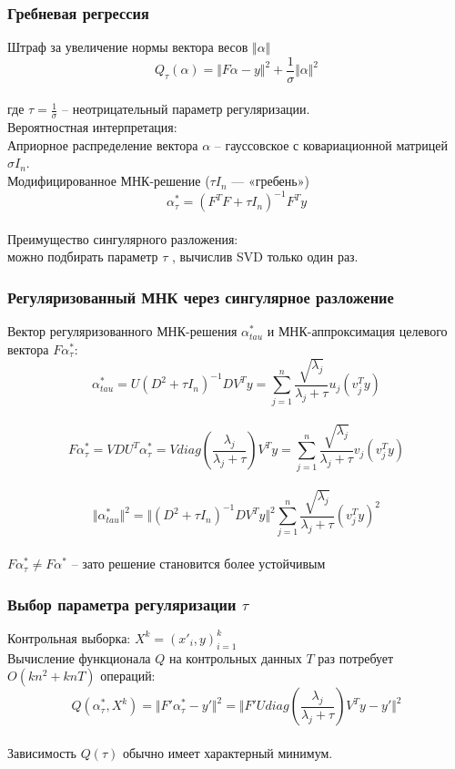 \documentclass[12pt]{beamer}
\begin{document}
\begin{frame}\frametitle{Гребневая регрессия}
Штраф за увеличение нормы вектора весов $\Vert \alpha \Vert$\\
$$Q_{\tau} (\alpha) = \Vert F \alpha - y \Vert^2 + \frac{1}{\sigma} \Vert \alpha \Vert^2$$\\
где $\tau = \frac{1}{\sigma}$ -- неотрицательный параметр регуляризации.\\
Вероятностная интерпретация: \\
Априорное распределение вектора $\alpha$ -- гауссовское с ковариационной матрицей $\sigma I_n$.\\
Модифицированное МНК-решение ($\tau I_n$ — «гребень»)\\
$$\alpha^*_{\tau} = (F^TF + \tau I_n)^{-1}F^Ty$$\\
Преимущество сингулярного разложения:\\
можно подбирать параметр $\tau$ , вычислив SVD только один раз.
\end{frame}

\begin{frame}\frametitle{Регуляризованный МНК через сингулярное разложение}
Вектор регуляризованного МНК-решения $\alpha_{tau}^*$ и МНК-аппроксимация целевого вектора $F\alpha_{\tau}^*$:\\
$$\alpha_{tau}^*= U(D^2 + \tau I_n)^{-1}DV^Ty = \sum\limits_{j=1}^n \frac{\sqrt{\lambda_j}}{\lambda_j + \tau} u_j(v_j^Ty)$$\\
$$F\alpha_{\tau}^* = VDU^T\alpha_{\tau}^* = V diag (\frac{\lambda_j}{\lambda_j + \tau}) V^Ty = \sum\limits_{j=1}^n \frac{\sqrt{\lambda_j}}{\lambda_j + \tau} v_j (v_j^Ty)$$\\
$$\Vert \alpha_{tau}^* \Vert^2 = \Vert (D^2 + \tau I_n)^{-1} DV^T y \Vert^2 \sum\limits_{j=1}^n \frac{\sqrt{\lambda_j}}{\lambda_j + \tau} (v^T_j y)^2$$\\
$F \alpha_{\tau}^* \neq F\alpha^*$ -- зато решение становится более устойчивым
\end{frame}

\begin{frame}\frametitle{Выбор параметра регуляризации $\tau$}
Контрольная выборка: $X^k = (x'_i, y)_{i=1}^k$\\
Вычисление функционала $Q$ на контрольных данных $T$ раз потребует $O(kn^2 + knT)$ операций:\\
$$Q(\alpha_{\tau}^*,X^k) = \Vert F' \alpha_{\tau}^* - y' \Vert^2 = \Vert F'U diag (\frac{\lambda_j}{\lambda_j + \tau}) V^T y -y' \Vert^2$$\\
Зависимость $Q(\tau)$ обычно имеет характерный минимум.
\end{frame}
\end{document}
